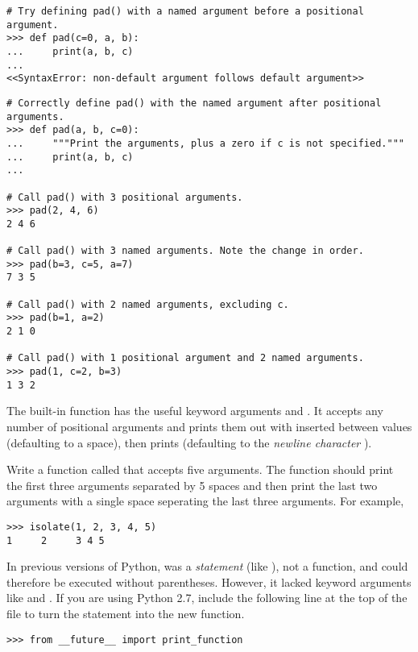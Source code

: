 \begin{lstlisting}
# Try defining pad() with a named argument before a positional argument.
>>> def pad(c=0, a, b):
...     print(a, b, c)
...
<<SyntaxError: non-default argument follows default argument>>
\end{lstlisting} %
\begin{lstlisting}
# Correctly define pad() with the named argument after positional arguments.
>>> def pad(a, b, c=0):
...     """Print the arguments, plus a zero if c is not specified."""
...     print(a, b, c)
...

# Call pad() with 3 positional arguments.
>>> pad(2, 4, 6)
2 4 6

# Call pad() with 3 named arguments. Note the change in order.
>>> pad(b=3, c=5, a=7)
7 3 5

# Call pad() with 2 named arguments, excluding c.
>>> pad(b=1, a=2)
2 1 0

# Call pad() with 1 positional argument and 2 named arguments.
>>> pad(1, c=2, b=3)
1 3 2
\end{lstlisting}

\begin{problem}
The built-in  function has the useful keyword arguments  and .
It accepts any number of positional arguments and prints them out with  inserted between values (defaulting to a space), then prints  (defaulting to the \emph{newline character} ).

Write a function called  that accepts five arguments. 
The function should print the first three arguments separated by 5 spaces and then print the last two arguments with a single space seperating the last three arguments.
For example,
\begin{lstlisting}
>>> isolate(1, 2, 3, 4, 5)
1     2     3 4 5
\end{lstlisting}
\end{problem}

\begin{warn} %
In previous versions of Python,  was a \emph{statement} (like ), not a function, and could therefore be executed without parentheses.
However, it lacked keyword arguments like  and .
If you are using Python 2.7, include the following line at the top of the file to turn the  statement into the new  function.
\begin{lstlisting}
>>> from __future__ import print_function
\end{lstlisting}
\end{warn}

